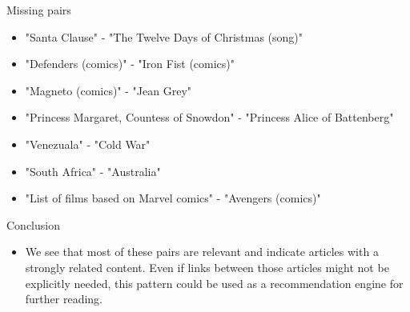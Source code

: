 \documentclass[final]{beamer}
\newlength{\onecolwid}
\begin{document}
\begin{frame}[t]
\begin{columns}[t]
\begin{column}{\onecolwid}
\begin{block}{Missing pairs}
  \begin{itemize}
    \item "Santa Clause" - "The Twelve Days of Christmas (song)"
    \item "Defenders (comics)" - "Iron Fist (comics)"
    \item "Magneto (comics)" - "Jean Grey"
    \item "Princess Margaret, Countess of Snowdon" - "Princess Alice of Battenberg"
    \item "Venezuala" - "Cold War"
    \item "South Africa" - "Australia"
    \item "List of films based on Marvel comics" - "Avengers (comics)"
  \end{itemize}

\end{block}






\begin{block}{Conclusion}
\begin{itemize}
  \item We see that most of these pairs are relevant and indicate articles with a strongly related content. Even if links between those articles might not be explicitly needed, this pattern could be used as a recommendation engine for further reading.


\end{itemize}
\end{block}
\end{column}
\end{columns}
\end{frame}
\end{document}
